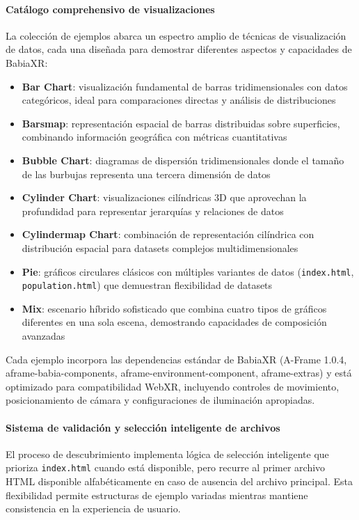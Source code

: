 \documentclass[a4paper, 12pt]{book}
\begin{document}
\paragraph{Catálogo comprehensivo de visualizaciones}
La colección de ejemplos abarca un espectro amplio de técnicas de visualización de datos, cada una diseñada para demostrar diferentes aspectos y capacidades de BabiaXR:

\begin{itemize}
  \item \textbf{Bar Chart}: visualización fundamental de barras tridimensionales con datos categóricos, ideal para comparaciones directas y análisis de distribuciones
  \item \textbf{Barsmap}: representación espacial de barras distribuidas sobre superficies, combinando información geográfica con métricas cuantitativas
  \item \textbf{Bubble Chart}: diagramas de dispersión tridimensionales donde el tamaño de las burbujas representa una tercera dimensión de datos
  \item \textbf{Cylinder Chart}: visualizaciones cilíndricas 3D que aprovechan la profundidad para representar jerarquías y relaciones de datos
  \item \textbf{Cylindermap Chart}: combinación de representación cilíndrica con distribución espacial para datasets complejos multidimensionales
  \item \textbf{Pie}: gráficos circulares clásicos con múltiples variantes de datos (\texttt{index.html}, \texttt{population.html}) que demuestran flexibilidad de datasets
  \item \textbf{Mix}: escenario híbrido sofisticado que combina cuatro tipos de gráficos diferentes en una sola escena, demostrando capacidades de composición avanzadas
\end{itemize}

Cada ejemplo incorpora las dependencias estándar de BabiaXR (A-Frame 1.0.4, aframe-babia-components, aframe-environment-component, aframe-extras) y está optimizado para compatibilidad WebXR, incluyendo controles de movimiento, posicionamiento de cámara y configuraciones de iluminación apropiadas.

\paragraph{Sistema de validación y selección inteligente de archivos}
El proceso de descubrimiento implementa lógica de selección inteligente que prioriza \texttt{index.html} cuando está disponible, pero recurre al primer archivo HTML disponible alfabéticamente en caso de ausencia del archivo principal. Esta flexibilidad permite estructuras de ejemplo variadas mientras mantiene consistencia en la experiencia de usuario.
\end{document}
